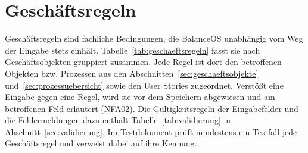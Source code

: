 \section{Geschäftsregeln}\label{sec:geschaeftsregeln}
Geschäftsregeln sind fachliche Bedingungen, die BalanceOS unabhängig vom Weg der Eingabe stets einhält. Tabelle~\ref{tab:geschaeftsregeln} fasst sie nach Geschäftsobjekten gruppiert zusammen. Jede Regel ist dort den betroffenen Objekten bzw. Prozessen aus den Abschnitten~\ref{sec:geschaeftsobjekte} und~\ref{sec:prozessuebersicht} sowie den User Stories zugeordnet. Verstößt eine Eingabe gegen eine Regel, wird sie vor dem Speichern abgewiesen und am betroffenen Feld erläutert (NFA02). Die Gültigkeitsregeln der Eingabefelder und die Fehlermeldungen dazu enthält Tabelle~\ref{tab:validierung} in Abschnitt~\ref{sec:validierung}. Im Testdokument prüft mindestens ein Testfall jede Geschäftsregel und verweist dabei auf ihre Kennung.

